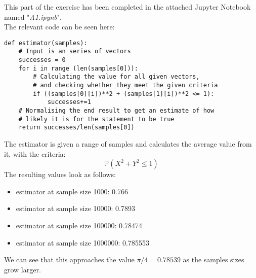 This part of the exercise has been completed in the attached Jupyter Notebook named "\textit{A1.ipynb}".\\
The relevant code can be seen here:
\begin{verbatim}
def estimator(samples):
    # Input is an series of vectors
    successes = 0
    for i in range (len(samples[0])):
        # Calculating the value for all given vectors,
        # and checking whether they meet the given criteria
        if ((samples[0][i])**2 + (samples[1][i])**2 <= 1):
            successes+=1
    # Normalising the end result to get an estimate of how
    # likely it is for the statement to be true
    return successes/len(samples[0])
\end{verbatim}
The estimator is given a range of samples and calculates the average value from it, with the criteria:
$$
\mathbb{P}(X^2+Y^2 \leq 1)
$$
The resulting values look as follows:
\begin{itemize}
\item estimator at sample size 1000: 0.766
\item estimator at sample size 10000: 0.7893
\item estimator at sample size 100000: 0.78474
\item estimator at sample size 1000000: 0.785553
\end{itemize}
We can see that this approaches the value $\pi/4 = 0.78539$ as the samples sizes grow larger.